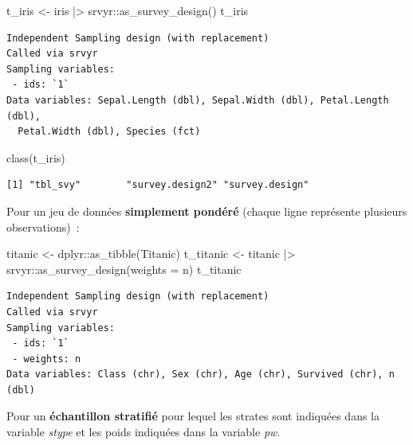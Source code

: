 \documentclass[
  letterpaper,
  DIV=11,
  numbers=noendperiod,
  oneside]{scrreprt}
\newenvironment{Shaded}{\begin{snugshade}}{\end{snugshade}}
\newcommand{\AttributeTok}[1]{\textcolor[rgb]{0.40,0.45,0.13}{#1}}
\newcommand{\FunctionTok}[1]{\textcolor[rgb]{0.28,0.35,0.67}{#1}}
\newcommand{\NormalTok}[1]{\textcolor[rgb]{0.00,0.23,0.31}{#1}}
\newcommand{\OtherTok}[1]{\textcolor[rgb]{0.00,0.23,0.31}{#1}}
\newcommand{\SpecialCharTok}[1]{\textcolor[rgb]{0.37,0.37,0.37}{#1}}
\begin{document}
\begin{Shaded}
\begin{Highlighting}[]
\NormalTok{t\_iris }\OtherTok{\textless{}{-}}\NormalTok{ iris }\SpecialCharTok{|\textgreater{}} 
\NormalTok{  srvyr}\SpecialCharTok{::}\FunctionTok{as\_survey\_design}\NormalTok{()}
\NormalTok{t\_iris}
\end{Highlighting}
\end{Shaded}

\begin{verbatim}
Independent Sampling design (with replacement)
Called via srvyr
Sampling variables:
 - ids: `1`
Data variables: Sepal.Length (dbl), Sepal.Width (dbl), Petal.Length (dbl),
  Petal.Width (dbl), Species (fct)
\end{verbatim}

\begin{Shaded}
\begin{Highlighting}[]
\FunctionTok{class}\NormalTok{(t\_iris)}
\end{Highlighting}
\end{Shaded}

\begin{verbatim}
[1] "tbl_svy"        "survey.design2" "survey.design" 
\end{verbatim}

Pour un jeu de données \textbf{simplement pondéré} (chaque ligne
représente plusieurs observations)~:

\begin{Shaded}
\begin{Highlighting}[]
\NormalTok{titanic }\OtherTok{\textless{}{-}}\NormalTok{ dplyr}\SpecialCharTok{::}\FunctionTok{as\_tibble}\NormalTok{(Titanic)}
\NormalTok{t\_titanic }\OtherTok{\textless{}{-}}\NormalTok{ titanic }\SpecialCharTok{|\textgreater{}} 
\NormalTok{  srvyr}\SpecialCharTok{::}\FunctionTok{as\_survey\_design}\NormalTok{(}\AttributeTok{weights =}\NormalTok{ n)}
\NormalTok{t\_titanic}
\end{Highlighting}
\end{Shaded}

\begin{verbatim}
Independent Sampling design (with replacement)
Called via srvyr
Sampling variables:
 - ids: `1`
 - weights: n
Data variables: Class (chr), Sex (chr), Age (chr), Survived (chr), n (dbl)
\end{verbatim}

Pour un \textbf{échantillon stratifié} pour lequel les strates sont
indiquées dans la variable \emph{stype} et les poids indiquées dans la
variable \emph{pw}.
\end{document}
